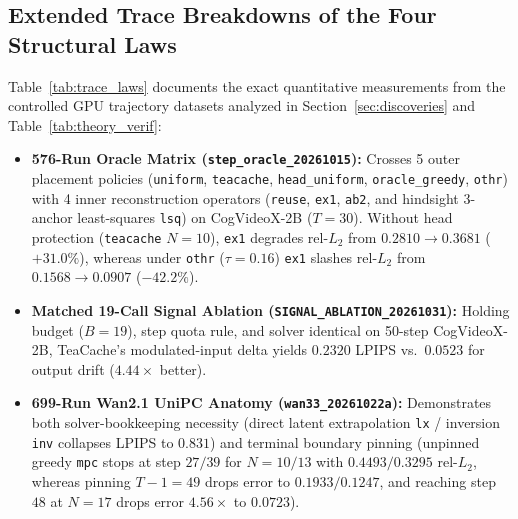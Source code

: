 \subsection{Extended Trace Breakdowns of the Four Structural Laws}
\label{app:extended_traces}

Table~\ref{tab:trace_laws} documents the exact quantitative measurements from the controlled GPU trajectory datasets analyzed in Section~\ref{sec:discoveries} and Table~\ref{tab:theory_verif}:
\begin{itemize}
\item \textbf{576-Run Oracle Matrix (\texttt{step\_oracle\_20261015}):} Crosses 5 outer placement policies (\texttt{uniform}, \texttt{teacache}, \texttt{head\_uniform}, \texttt{oracle\_greedy}, \texttt{othr}) with 4 inner reconstruction operators (\texttt{reuse}, \texttt{ex1}, \texttt{ab2}, and hindsight 3-anchor least-squares \texttt{lsq}) on CogVideoX-2B ($T=30$). Without head protection (\texttt{teacache} $N=10$), \texttt{ex1} degrades rel-$L_2$ from $0.2810 \to 0.3681$ ($+31.0\%$), whereas under \texttt{othr} ($\tau=0.16$) \texttt{ex1} slashes rel-$L_2$ from $0.1568 \to 0.0907$ ($-42.2\%$).
\item \textbf{Matched 19-Call Signal Ablation (\texttt{SIGNAL\_ABLATION\_20261031}):} Holding budget ($B=19$), step quota rule, and solver identical on 50-step CogVideoX-2B, TeaCache's modulated-input delta yields $0.2320$ LPIPS vs.\ $0.0523$ for output drift ($4.44\times$ better).
\item \textbf{699-Run Wan2.1 UniPC Anatomy (\texttt{wan33\_20261022a}):} Demonstrates both solver-bookkeeping necessity (direct latent extrapolation \texttt{lx} / inversion \texttt{inv} collapses LPIPS to $0.831$) and terminal boundary pinning (unpinned greedy \texttt{mpc} stops at step $27/39$ for $N=10/13$ with $0.4493 / 0.3295$ rel-$L_2$, whereas pinning $T-1=49$ drops error to $0.1933 / 0.1247$, and reaching step $48$ at $N=17$ drops error $4.56\times$ to $0.0723$).
\end{itemize}

\begin{table}[ht]
\centering\footnotesize\setlength{\tabcolsep}{3.2pt}
\caption{\textbf{Non-commutativity of outer placement and inner prediction} (terminal latent rel-$L_2 \downarrow$, 576 GPU runs on CogVideoX-2B). Saturating Regime~I turns causal 1st-order prediction from $+31\%$ harm into within $2.6\%$ of the hindsight 3-anchor subspace oracle.}
\label{tab:trace_laws}
\end{table}

